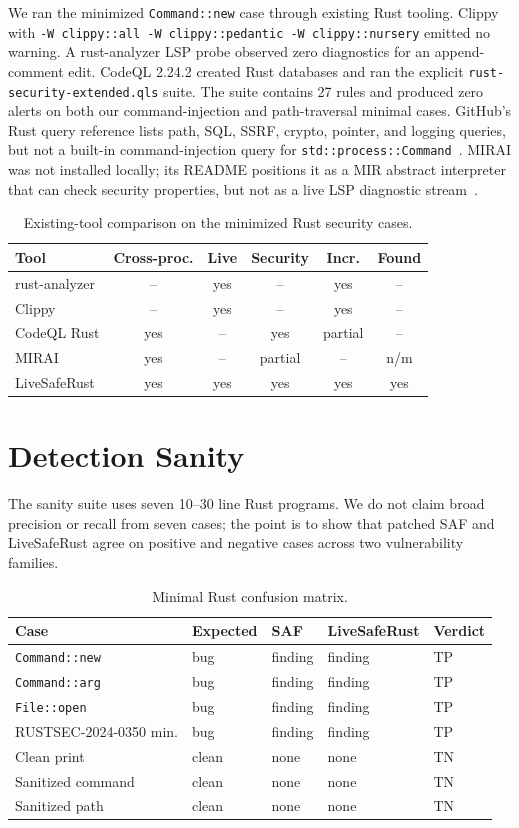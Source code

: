\documentclass[sigconf,nonacm]{acmart}
\begin{document}
We ran the minimized \texttt{Command::new} case through existing Rust tooling.
Clippy with \texttt{-W clippy::all -W clippy::pedantic -W clippy::nursery}
emitted no warning. A rust-analyzer LSP probe observed zero diagnostics for an
append-comment edit. CodeQL 2.24.2 created Rust databases and ran the explicit
\texttt{rust-security-extended.qls} suite. The suite contains 27 rules and
produced zero alerts on both our command-injection and path-traversal minimal
cases. GitHub's Rust query reference lists path, SQL, SSRF, crypto, pointer, and
logging queries, but not a built-in command-injection query for
\texttt{std::process::Command}~\cite{codeql-rust}. MIRAI was not installed
locally; its README positions it as a MIR abstract interpreter that can check
security properties, but not as a live LSP diagnostic stream~\cite{mirai}.

\begin{table}[h]
\caption{Existing-tool comparison on the minimized Rust security cases.}
\label{tab:comparison}
\begin{tabular}{lccccc}
\toprule
Tool & Cross-proc. & Live & Security & Incr. & Found \\
\midrule
rust-analyzer & -- & yes & -- & yes & -- \\
Clippy & -- & yes & -- & yes & -- \\
CodeQL Rust & yes & -- & yes & partial & -- \\
MIRAI & yes & -- & partial & -- & n/m \\
LiveSafeRust & yes & yes & yes & yes & yes \\
\bottomrule
\end{tabular}
\end{table}

\section{Detection Sanity}

The sanity suite uses seven 10--30 line Rust programs. We do not claim broad
precision or recall from seven cases; the point is to show that patched SAF and
LiveSafeRust agree on positive and negative cases across two vulnerability
families.

\begin{table}[h]
\caption{Minimal Rust confusion matrix.}
\label{tab:confusion}
\begin{tabular}{lllll}
\toprule
Case & Expected & SAF & LiveSafeRust & Verdict \\
\midrule
\texttt{Command::new} & bug & finding & finding & TP \\
\texttt{Command::arg} & bug & finding & finding & TP \\
\texttt{File::open} & bug & finding & finding & TP \\
RUSTSEC-2024-0350 min. & bug & finding & finding & TP \\
Clean print & clean & none & none & TN \\
Sanitized command & clean & none & none & TN \\
Sanitized path & clean & none & none & TN \\
\bottomrule
\end{tabular}
\end{table}
\end{document}
